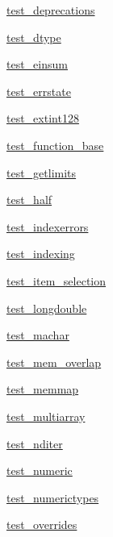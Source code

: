 \begin{DoxyCompactItemize}
\item 
 \hyperlink{namespacenumpy_1_1core_1_1tests_1_1test__deprecations}{test\+\_\+deprecations}
\item 
 \hyperlink{namespacenumpy_1_1core_1_1tests_1_1test__dtype}{test\+\_\+dtype}
\item 
 \hyperlink{namespacenumpy_1_1core_1_1tests_1_1test__einsum}{test\+\_\+einsum}
\item 
 \hyperlink{namespacenumpy_1_1core_1_1tests_1_1test__errstate}{test\+\_\+errstate}
\item 
 \hyperlink{namespacenumpy_1_1core_1_1tests_1_1test__extint128}{test\+\_\+extint128}
\item 
 \hyperlink{namespacenumpy_1_1core_1_1tests_1_1test__function__base}{test\+\_\+function\+\_\+base}
\item 
 \hyperlink{namespacenumpy_1_1core_1_1tests_1_1test__getlimits}{test\+\_\+getlimits}
\item 
 \hyperlink{namespacenumpy_1_1core_1_1tests_1_1test__half}{test\+\_\+half}
\item 
 \hyperlink{namespacenumpy_1_1core_1_1tests_1_1test__indexerrors}{test\+\_\+indexerrors}
\item 
 \hyperlink{namespacenumpy_1_1core_1_1tests_1_1test__indexing}{test\+\_\+indexing}
\item 
 \hyperlink{namespacenumpy_1_1core_1_1tests_1_1test__item__selection}{test\+\_\+item\+\_\+selection}
\item 
 \hyperlink{namespacenumpy_1_1core_1_1tests_1_1test__longdouble}{test\+\_\+longdouble}
\item 
 \hyperlink{namespacenumpy_1_1core_1_1tests_1_1test__machar}{test\+\_\+machar}
\item 
 \hyperlink{namespacenumpy_1_1core_1_1tests_1_1test__mem__overlap}{test\+\_\+mem\+\_\+overlap}
\item 
 \hyperlink{namespacenumpy_1_1core_1_1tests_1_1test__memmap}{test\+\_\+memmap}
\item 
 \hyperlink{namespacenumpy_1_1core_1_1tests_1_1test__multiarray}{test\+\_\+multiarray}
\item 
 \hyperlink{namespacenumpy_1_1core_1_1tests_1_1test__nditer}{test\+\_\+nditer}
\item 
 \hyperlink{namespacenumpy_1_1core_1_1tests_1_1test__numeric}{test\+\_\+numeric}
\item 
 \hyperlink{namespacenumpy_1_1core_1_1tests_1_1test__numerictypes}{test\+\_\+numerictypes}
\item 
 \hyperlink{namespacenumpy_1_1core_1_1tests_1_1test__overrides}{test\+\_\+overrides}

\end{DoxyCompactItemize}

